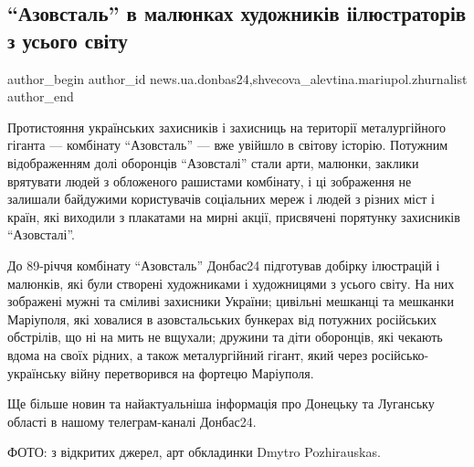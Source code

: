  
 
 
 
 
 
\subsection{\enquote{Азовсталь} в малюнках художників і\titlebreak ілюстраторів з усього світу}
\label{sec:13_08_2022.stz.news.ua.donbas24.2.azovstal_v_maljunkah_hudozhnykiv_z_usjogo_svity}
 
\ifcmt
 author_begin
   author_id news.ua.donbas24,shvecova_alevtina.mariupol.zhurnalist
 author_end
\fi

Протистояння українських захисників і захисниць на території металургійного
гіганта — комбінату \enquote{Азовсталь} — вже увійшло в світову історію. Потужним
відображенням долі оборонців \enquote{Азовсталі} стали арти, малюнки, заклики врятувати
людей з обложеного рашистами комбінату, і ці зображення не залишали байдужими
користувачів соціальних мереж і людей з різних міст і країн, які виходили з
плакатами на мирні акції, присвячені порятунку захисників \enquote{Азовсталі}.

До 89-річчя комбінату \enquote{Азовсталь} Донбас24 підготував добірку ілюстрацій і
малюнків, які були створені художниками і художницями з усього світу. На них
зображені мужні та сміливі захисники України; цивільні мешканці та мешканки
Маріуполя, які ховалися в азовстальських бункерах від потужних російських
обстрілів, що ні на мить не вщухали; дружини та діти оборонців, які чекають
вдома на своїх рідних, а також металургійний гігант, який через
російсько-українську війну перетворився на фортецю Маріуполя.


Ще більше новин та найактуальніша інформація про Донецьку та Луганську області
в нашому телеграм-каналі Донбас24.

ФОТО: з відкритих джерел, арт обкладинки Dmytro Pozhirauskas.

